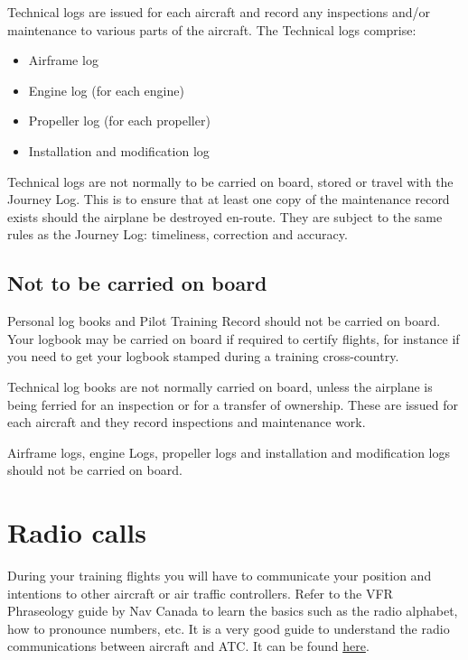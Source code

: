 \documentclass[12pt,letterpaper]{article}
\begin{document}
    Technical logs are issued for each aircraft and record any inspections and/or maintenance to various parts of the aircraft. The Technical logs comprise:
    \begin{itemize}
        \item Airframe log
        \item Engine log (for each engine)
        \item Propeller log (for each propeller)
        \item Installation and modification log
    \end{itemize}
    
    Technical logs are not normally to be carried on board, stored or travel with the Journey Log.  This is to ensure that at least one copy of the maintenance record exists should the airplane be destroyed en-route. They are subject to the same rules as the Journey Log: timeliness, correction and accuracy.

    \subsection{Not to be carried on board}
    
    Personal log books and Pilot Training Record should not be carried on board. Your logbook may be carried on board if required to certify flights, for instance if you need to get your logbook stamped during a training cross-country.
    
    Technical log books are not normally carried on board, unless the airplane is being ferried for an inspection or for a transfer of ownership. These are issued for each aircraft and they record inspections and maintenance work.  
    
    Airframe logs, engine Logs, propeller logs and installation and modification logs should not be carried on board.
    
 \section{Radio calls}
    During your training flights you will have to communicate your position and intentions to other aircraft or air traffic controllers. Refer to the VFR Phraseology guide by Nav Canada to learn the basics such as the radio alphabet, how to pronounce numbers, etc. It is a very good guide to understand the radio communications between aircraft and ATC. It can be found \href{https://www.navcanada.ca/en/vfr-phraseology.pdf}{\color{cyan}here}.
    
\end{document}
